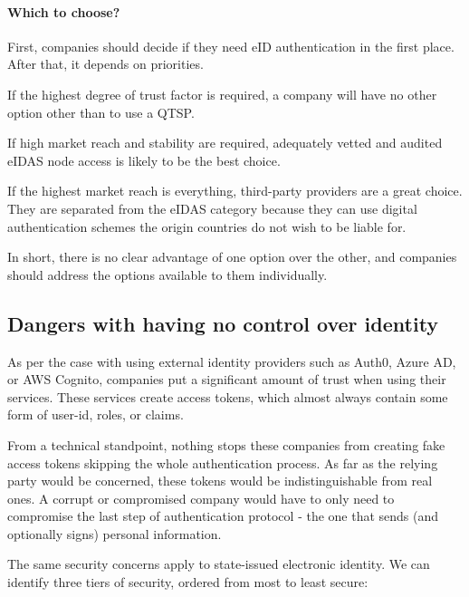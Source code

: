 \paragraph{Which to choose?} First, companies should decide if they need eID authentication in the first place. After that, it depends on priorities.

If the highest degree of trust factor is required, a company will have no other option other than to use a QTSP.

If high market reach and stability are required, adequately vetted and audited eIDAS node access is likely to be the best choice.

If the highest market reach is everything, third-party providers are a great choice. They are separated from the eIDAS category because they can use digital authentication schemes the origin countries do not wish to be liable for.

In short, there is no clear advantage of one option over the other, and companies should address the options available to them individually.


\subsection{Dangers with having no control over identity}

As per the case with using external identity providers such as Auth0, Azure AD, or AWS Cognito, companies put a significant amount of trust when using their services. These services create access tokens, which almost always contain some form of user-id, roles, or claims.

From a technical standpoint, nothing stops these companies from creating fake access tokens skipping the whole authentication process. As far as the relying party would be concerned, these tokens would be indistinguishable from real ones. A corrupt or compromised company would have to only need to compromise the last step of authentication protocol - the one that sends (and optionally signs) personal information.

The same security concerns apply to state-issued electronic identity. We can identify three tiers of security, ordered from most to least secure:


